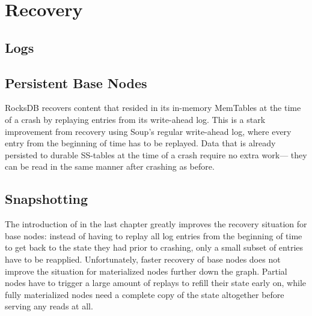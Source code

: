 \chapter{Recovery}

\section{Logs}

\section{Persistent Base Nodes}

RocksDB recovers content that resided in its in-memory MemTables at the time of
a crash by replaying entries from its write-ahead log. This is a stark
improvement from recovery using Soup's regular write-ahead log, where every
entry from the beginning of time has to be replayed. Data that is already
persisted to durable SS-tables at the time of a crash require no extra work---
they can be read in the same manner after crashing as before.


\section{Snapshotting}\label{sec:snapshotting}

The introduction of  in the last chapter greatly improves
the recovery situation for base nodes: instead of having to replay all log
entries from the beginning of time to get back to the state they had prior to
crashing, only a small subset of entries have to be reapplied. Unfortunately,
faster recovery of base nodes does not improve the situation for materialized
nodes further down the graph. Partial nodes have to trigger a large amount of
replays to refill their state early on, while fully materialized nodes need a
complete copy of the state altogether before serving any reads at all.

